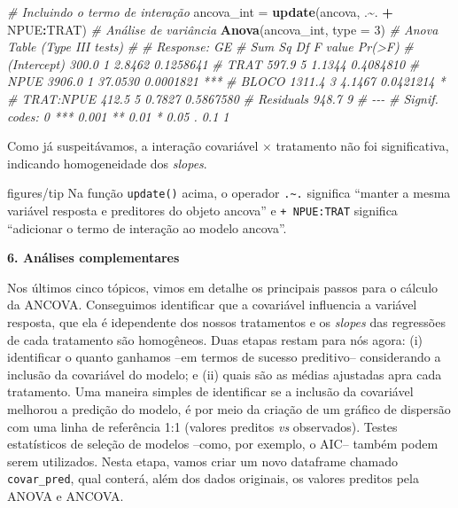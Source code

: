 \documentclass[
]{book}
\newenvironment{Shaded}{\begin{snugshade}}{\end{snugshade}}
\newcommand{\CommentTok}[1]{\textcolor[rgb]{0.56,0.35,0.01}{\textit{#1}}}
\newcommand{\DataTypeTok}[1]{\textcolor[rgb]{0.13,0.29,0.53}{#1}}
\newcommand{\DecValTok}[1]{\textcolor[rgb]{0.00,0.00,0.81}{#1}}
\newcommand{\KeywordTok}[1]{\textcolor[rgb]{0.13,0.29,0.53}{\textbf{#1}}}
\newcommand{\NormalTok}[1]{#1}
\newcommand{\OperatorTok}[1]{\textcolor[rgb]{0.81,0.36,0.00}{\textbf{#1}}}
\newcommand{\StringTok}[1]{\textcolor[rgb]{0.31,0.60,0.02}{#1}}
\numberwithin{equation}{section}
\newcommand{\indt}[1]{\index{#1|ST}}
\newenvironment{dica}
  {\begin{customBlockImage}[colframe=customBlue, title=Dica]{figures/tip}}
  {\end{customBlockImage}}
\begin{document}
\begin{Shaded}
\begin{Highlighting}[]
\CommentTok{\# Incluindo o termo de interação}
\NormalTok{ancova\_int =}\StringTok{ }\KeywordTok{update}\NormalTok{(ancova, .}\OperatorTok{\textasciitilde{}}\NormalTok{. }\OperatorTok{+}\StringTok{ }\NormalTok{NPUE}\OperatorTok{:}\NormalTok{TRAT)}
\CommentTok{\# Análise de variância}
\KeywordTok{Anova}\NormalTok{(ancova\_int, }\DataTypeTok{type =} \DecValTok{3}\NormalTok{) }
\CommentTok{\# Anova Table (Type III tests)}
\CommentTok{\# }
\CommentTok{\# Response: GE}
\CommentTok{\#             Sum Sq Df F value    Pr(\textgreater{}F)    }
\CommentTok{\# (Intercept)  300.0  1  2.8462 0.1258641    }
\CommentTok{\# TRAT         597.9  5  1.1344 0.4084810    }
\CommentTok{\# NPUE        3906.0  1 37.0530 0.0001821 ***}
\CommentTok{\# BLOCO       1311.4  3  4.1467 0.0421214 *  }
\CommentTok{\# TRAT:NPUE    412.5  5  0.7827 0.5867580    }
\CommentTok{\# Residuals    948.7  9                      }
\CommentTok{\# {-}{-}{-}}
\CommentTok{\# Signif. codes:  0 \textquotesingle{}***\textquotesingle{} 0.001 \textquotesingle{}**\textquotesingle{} 0.01 \textquotesingle{}*\textquotesingle{} 0.05 \textquotesingle{}.\textquotesingle{} 0.1 \textquotesingle{} \textquotesingle{} 1}
\end{Highlighting}
\end{Shaded}

Como já suspeitávamos, a interação covariável \(\times\) tratamento não foi significativa, indicando homogeneidade dos \emph{slopes}.

\indt{Dicas}
\begin{dica}
Na função \texttt{update()} acima, o operador \texttt{.\textasciitilde{}.} significa ``manter a mesma variável resposta e preditores do objeto ancova'' e \texttt{+\ NPUE:TRAT} significa ``adicionar o termo de interação ao modelo ancova''.
\end{dica}

\textbf{6. Análises complementares}

Nos últimos cinco tópicos, vimos em detalhe os principais passos para o cálculo da ANCOVA. Conseguimos identificar que a covariável influencia a variável resposta, que ela é idependente dos nossos tratamentos e os \emph{slopes} das regressões de cada tratamento são homogêneos. Duas etapas restam para nós agora: (i) identificar o quanto ganhamos --em termos de sucesso preditivo-- considerando a inclusão da covariável do modelo; e (ii) quais são as médias ajustadas apra cada tratamento. Uma maneira simples de identificar se a inclusão da covariável melhorou a predição do modelo, é por meio da criação de um gráfico de dispersão com uma linha de referência 1:1 (valores preditos \emph{vs} observados). Testes estatísticos de seleção de modelos --como, por exemplo, o AIC-- também podem serem utilizados. Nesta etapa, vamos criar um novo dataframe chamado \texttt{covar\_pred}, qual conterá, além dos dados originais, os valores preditos pela ANOVA\indt{ANOVA} e ANCOVA.
\end{document}
